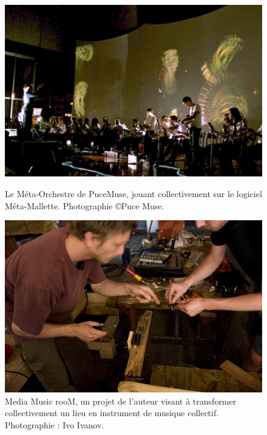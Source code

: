\begin{figure}[!htbp]
	\captionsetup{format=plain}%
	\centering
	\begin{minipage}[t]{0.48\textwidth}
		\includegraphics[width=\linewidth]{gfx/02_ephemeral/MetaOrchestre.jpg}
		\caption[Méta-Orchestre, jouant collectivement sur le logiciel Méta-Mallette]{Le Méta-Orchestre de PuceMuse, jouant collectivement sur le logiciel Méta-Mallette. Photographie \copyright Puce Muse.}
		\label{fig:ephemeral:meta-orchestre}
	\end{minipage}
	\hspace{.02\linewidth}
	\begin{minipage}[t]{0.48\textwidth}
	  \includegraphics[width=\linewidth]{gfx/02_ephemeral/MediaMusicRoom.jpg}
		\caption[Media Music rooM, transformation collective d'un lieu en instrument de musique]{Media Music rooM, un projet de l'auteur visant à transformer collectivement un lieu en instrument de musique collectif. Photographie : Ivo Ivanov.}
		\label{fig:ephemeral:mediamusicroom}
	\end{minipage}
\end{figure}

